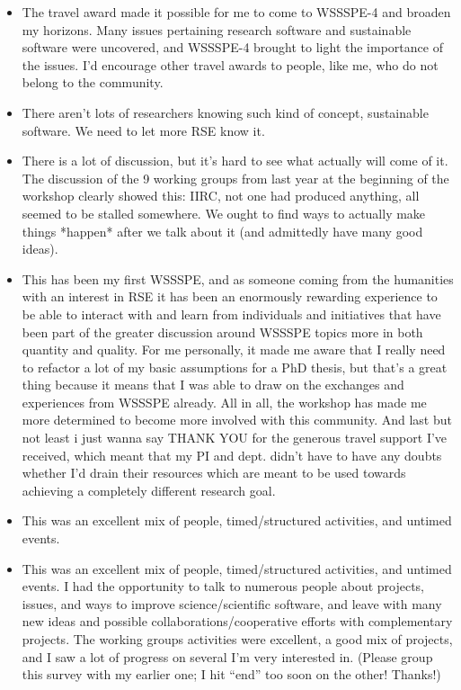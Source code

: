 \begin{enumerate}
\begin{itemize}
\item The travel award made it possible for me to come to WSSSPE-4 and broaden my horizons.  Many issues pertaining research software and sustainable software were uncovered, and WSSSPE-4 brought to light the importance of the issues.  I'd encourage other travel awards to people, like me, who do not belong to the community.
\item There aren't lots of researchers knowing such kind of concept, sustainable software. We need to let more RSE know it.
\item There is a lot of discussion, but it's hard to see what actually will come of it. The discussion of the 9 working groups from last year at the beginning of the workshop clearly showed this: IIRC, not one had produced anything, all seemed to be stalled somewhere. We ought to find ways to actually make things *happen* after we talk about it (and admittedly have many good ideas).
\item This has been my first WSSSPE, and as someone coming from the humanities with an interest in RSE it has been an enormously rewarding experience to be able to interact with and learn from individuals and initiatives that have been part of the greater discussion around WSSSPE topics more in both quantity and quality. For me personally, it made me aware that I really need to refactor a lot of my basic assumptions for a PhD thesis, but that's a great thing because it means that I was able to draw on the exchanges and experiences from WSSSPE already. All in all, the workshop has made me more determined to become more involved with this community. And last but not least i just wanna say THANK YOU for the generous travel support I've received, which meant that my PI and dept. didn't have to have any doubts whether I'd drain their resources which are meant to be used towards achieving a completely different research goal.
\item This was an excellent mix of people, timed/structured activities, and untimed events.
\item This was an excellent mix of people, timed/structured activities, and untimed events. I had the opportunity to talk to numerous people about projects, issues, and ways to improve science/scientific software, and leave with many new ideas and possible collaborations/cooperative efforts with complementary projects. The working groups activities were excellent, a good mix of projects, and I saw a lot of progress on several I'm very interested in. (Please group this survey with my earlier one; I hit ``end'' too soon on the other! Thanks!)

\end{itemize}
\end{enumerate}
